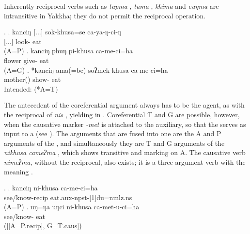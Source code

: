 Inherently reciprocal verbs such as \emph{tupma} , \emph{tuma} , \emph{khima}  and \emph{cuŋma}  are intransitive in Yakkha; they do not permit the reciprocal operation. 

\ex. \ag. kanciŋ [...] sok-khusa=se ca-ya-ŋ-ci-ŋ\\
  [...] look- eat\\
 (A=P) 
\bg. kanciŋ phuŋ pi-khusa ca-me-ci=ha\\
 flower give- eat\\
 (A=G)
\bg. *kanciŋ ama(=be) soʔmek-khusa ca-me-ci=ha\\
 mother() show- eat\\
Intended:  (*A=T)


The antecedent of the coreferential argument always has to be the agent, as with the reciprocal of \emph{nis} , yielding  in \Next[a]. Coreferential T and G are possible, however, when the causative marker \emph{-met} is attached to the auxiliary, so that the  serves as input to a  (see \Next[b]). The arguments that are fused into one  are the A and P arguments of the , and simultaneously they are T and G arguments of the  \emph{nikhusa cameʔma} , which shows transitive  and   marking on A. The causative verb \emph{nimeʔma}, without the reciprocal, also exists; it is a three-argument verb with the meaning  .

\ex. \ag. kanciŋ ni-khusa  ca-me-ci=ha\\
			   see/know-{\sc recip}  eat{\sc .aux-npst-[1]du=nmlz.ns}\\
			 (A=P)
	\bg. uŋ=ŋa uŋci ni-khusa ca-met-u-ci=ha\\
	  see/know- eat\\
	 ([[A=P.{\sc recip}], G=T.{\sc caus}])	
	

